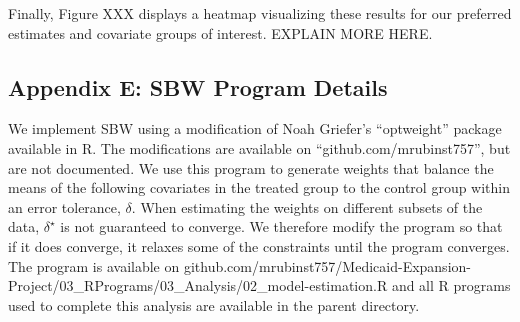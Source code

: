 \documentclass[12pt]{article}
\begin{document}
Finally, Figure XXX displays a heatmap visualizing these results for our preferred estimates and covariate groups of interest. EXPLAIN MORE HERE.


\subsection{Appendix E: SBW Program Details}

We implement SBW using a modification of Noah Griefer's ``optweight'' package available in R. The modifications are available on ``github.com/mrubinst757'', but are not documented. We use this program to generate weights that balance the means of the following covariates in the treated group to the control group within an error tolerance, $\delta$. When estimating the weights on different subsets of the data, $\delta^\star$ is not guaranteed to converge. We therefore modify the program so that if it does converge, it relaxes some of the constraints until the program converges. The program is available on github.com/mrubinst757/Medicaid-Expansion-Project/03\_RPrograms/03\_Analysis/02\_model-estimation.R and all R programs used to complete this analysis are available in the parent directory.
\end{document}
